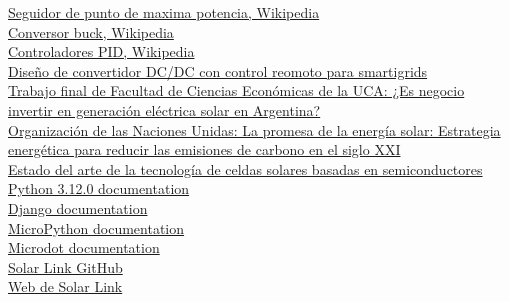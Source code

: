 \href{https://en.wikipedia.org/wiki/Maximum_power_point_tracking}{Seguidor de punto de maxima potencia, Wikipedia}\\

\href{https://en.wikipedia.org/wiki/Buck_converter}{Conversor buck, Wikipedia}\\

\href{https://es.wikipedia.org/wiki/Controlador_PID}{Controladores PID, Wikipedia}\\

\href{https://oa.upm.es/55985/1/TFG_ALBERTO_JIMENEZ_DE_LA_PENA.pdf}{Diseño de convertidor DC/DC con control reomoto para smartigrids}\\

\href{https://repositorio.uca.edu.ar/bitstream/123456789/11949/1/Bassani%20Mariano.%20TRABAJO%20FINAL%20DE%20MBA_MB_20210311_v2.pdf}{Trabajo final de Facultad de Ciencias Económicas de la UCA: ¿Es negocio invertir en generación eléctrica solar en Argentina?}\\

\href{https://www.un.org/es/chronicle/article/la-promesa-de-la-energia-solar-estrategia-energetica-para-reducir-las-emisiones-de-carbono-en-el#:~:text=De%20acuerdo%20con%20la%20Federaci%C3%B3n,ahorrar%20600%20kilogramos%20de%20CO2}{Organización de las Naciones Unidas: La promesa de la energía solar: Estrategia energética para reducir las emisiones de carbono en el siglo XXI}\\

\href{https://ri.conicet.gov.ar/handle/11336/182578?show=full}{Estado del arte de la tecnología de celdas solares basadas en semiconductores}\\

\href{https://docs.python.org/3/index.html}{Python 3.12.0 documentation}\\

\href{https://docs.djangoproject.com/en/4.2/}{Django documentation}\\

\href{https://docs.micropython.org/en/latest/}{MicroPython documentation}\\

\href{https://microdot.readthedocs.io/en/latest/}{Microdot documentation}\\

\href{https://github.com/solarlink-ar/solarlink}{Solar Link GitHub}\\

\href{https://solarlink.ar}{Web de Solar Link}\\

